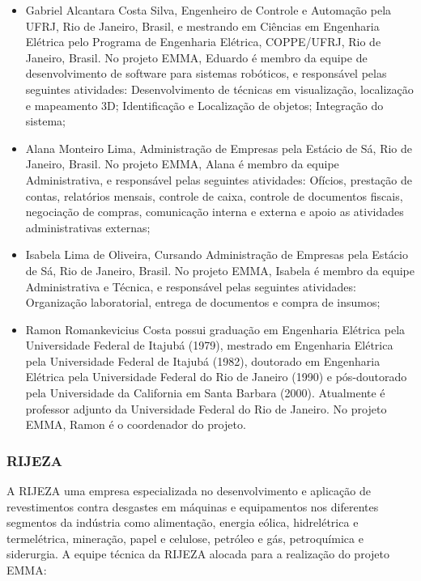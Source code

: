 \begin{itemize}
\item Gabriel Alcantara Costa Silva, Engenheiro de Controle e Automação pela
UFRJ, Rio de Janeiro, Brasil, e mestrando em Ciências em Engenharia Elétrica pelo
Programa de Engenharia Elétrica, COPPE/UFRJ, Rio de Janeiro, Brasil. No projeto
EMMA, Eduardo é membro da equipe de desenvolvimento de software para sistemas
robóticos, e responsável pelas seguintes atividades: Desenvolvimento de técnicas
em visualização, localização e mapeamento 3D; Identificação e
Localização de objetos; Integração do sistema;

\item Alana Monteiro Lima, Administração de Empresas pela Estácio de Sá, Rio de
Janeiro, Brasil. No projeto EMMA, Alana é membro da equipe Administrativa, e 
responsável pelas seguintes atividades: Ofícios, prestação de contas, 
relatórios mensais, controle de caixa, controle de documentos fiscais, 
negociação de compras, comunicação interna e externa e apoio as atividades 
administrativas externas;

\item Isabela Lima de Oliveira, Cursando Administração de Empresas pela Estácio
de Sá, Rio de Janeiro, Brasil. No projeto EMMA, Isabela é membro da 
equipe Administrativa e Técnica, e responsável pelas seguintes atividades: 
Organização laboratorial, entrega de documentos e compra de insumos;

\item Ramon Romankevicius Costa possui graduação em Engenharia Elétrica pela
Universidade Federal de Itajubá (1979), mestrado em Engenharia Elétrica pela 
Universidade Federal de Itajubá (1982), doutorado em Engenharia Elétrica pela
Universidade Federal do Rio de Janeiro (1990) e pós-doutorado pela Universidade 
da Cali\-fornia em Santa
Barbara (2000). Atualmente é professor adjunto da Universidade Federal do Rio de
Janeiro. No projeto EMMA, Ramon é o coordenador do projeto.

\end{itemize}


\subsubsection{RIJEZA} 

A RIJEZA uma empresa especializada no desenvolvimento e
aplicação de revestimentos contra desgastes em máquinas e equipamentos nos diferentes
segmentos da indústria como alimentação, energia eólica, hidrelétrica e
termelétrica, mineração, papel e celulose, petróleo e gás, petroquímica e siderurgia.
A equipe técnica da RIJEZA alocada para a realização do projeto EMMA:

